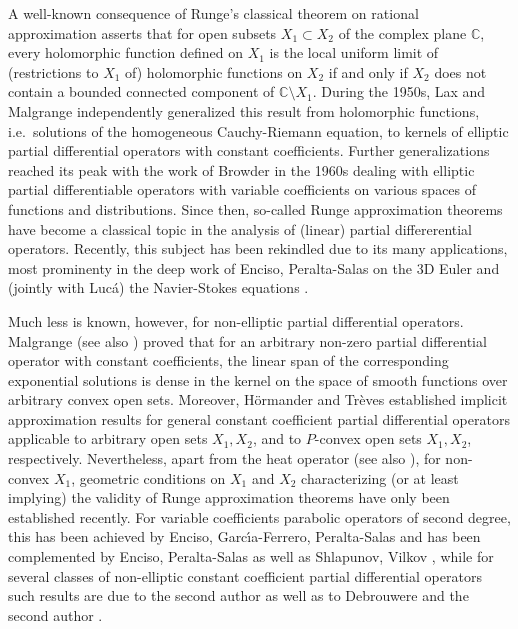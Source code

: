 \documentclass[10pt,leqno]{amsart}
\theoremstyle{definition}
\newcommand{\C}{\mathbb C}
\begin{document}
A well-known consequence of Runge's classical theorem on rational approximation asserts that for open subsets $X_1 \subset X_2$ of the complex plane $\C$, every holomorphic function defined on $X_1$ is the local uniform limit of (restrictions to $X_1$ of) holomorphic functions on $X_2$ if and only if $X_2$ does not contain a bounded connected component of $\C\setminus X_1$. During the 1950s, Lax \cite{Lax} and Malgrange \cite{Malgrange} independently generalized this result from holomorphic functions, i.e.~solutions of the homogeneous Cauchy-Riemann equation, to kernels of elliptic partial differential operators with constant coefficients. Further generalizations reached its peak with the work of Browder \cite{Browder1962b, Browder1962} in the 1960s dealing with elliptic partial differentiable operators with variable coefficients on various spaces of functions and distributions. Since then, so-called Runge approximation theorems have become a classical topic in the analysis of (linear) partial differerential operators. Recently, this subject has been rekindled due to its many applications, most prominenty in the deep work of Enciso, Peralta-Salas on the 3D Euler \cite{EnPe12,EnPe15} and (jointly with Luc\'a) the Navier-Stokes equations \cite{EnLuPe17}.

Much less is known, however, for non-elliptic partial differential operators. Malgrange \cite[Chapitre 1.2, Th\'eor\`eme 2]{Malgrange} (see also \cite[Theorem 10.5.1]{Hor2}) proved that for an arbitrary non-zero partial differential operator with constant coefficients, the linear span of the corresponding exponential solutions is dense in the kernel on the space of smooth functions over arbitrary convex open sets. Moreover, H\"ormander \cite[Theorem 10.5.2]{Hor2} and Tr\`eves \cite[Theorem 26.1]{Treves-LCS-PDE} established implicit approximation results for general constant coefficient partial differential operators applicable to arbitrary open sets $X_1, X_2$, and to $P$-convex open sets $X_1, X_2$, respectively. Nevertheless, apart from the heat operator \cite{Diaz1980,Jones1975} (see also \cite{GT}), for non-convex $X_1$, geometric conditions on $X_1$ and $X_2$ characterizing (or at least implying) the validity of Runge approximation theorems have only been established recently. For variable coefficients parabolic operators of second degree, this has been achieved by Enciso, Garc\'{\i}a-Ferrero, Peralta-Salas \cite{EnGaPe19} and has been complemented by Enciso, Peralta-Salas \cite{EnPe21} as well as Shlapunov, Vilkov \cite{ShVi24}, while for several classes of non-elliptic constant coefficient partial differential operators such results are due to the second author \cite{Kalmes2021} as well as to Debrouwere and the second author \cite{DebKalmes2024}.
\end{document}
